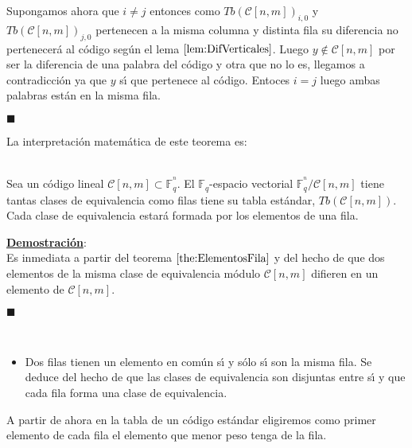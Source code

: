 Supongamos ahora que $i\neq j$ entonces como $Tb(\mathcal{C}[n,m])_{i,0}$ y
$Tb(\mathcal{C}[n,m])_{j,0}$ pertenecen a la misma columna y distinta fila
su diferencia no pertenecer\'a al c\'odigo seg\'un el lema
$\ref{lem:DifVerticales}$. Luego $y\notin \mathcal{C}[n,m]$ por ser la
diferencia de una palabra del c\'odigo y otra que no lo es, llegamos a 
contradicci\'on ya que $y$ s\'{\i} que pertenece al c\'odigo. Entoces $i=j$
luego ambas palabras est\'an en la misma fila.
\begin{flushright}
$\blacksquare$
\end{flushright}
%
\newpage
%
La interpretaci\'on matem\'atica de este teorema es:
\begin{corolario}
\ \\
Sea un c\'odigo lineal $\mathcal{C}[n,m]\subset \mathbb{F}^{^n}_q$. El
 $\mathbb{F}_q$-espacio vectorial $\mathbb{F}^{^n}_q/\mathcal{C}[n,m]$ tiene
tantas clases de equivalencia como filas tiene su tabla est\'andar,
$Tb(\mathcal{C}[n,m])$. Cada clase de equivalencia estar\'a formada por los
elementos de una fila. 
\end{corolario}
\underline{\textbf{Demostraci\'on}}:\\
Es inmediata a partir del teorema $\ref{the:ElementosFila}$ y del hecho de que
dos elementos de la misma clase de equivalencia m\'odulo $\mathcal{C}[n,m]$ 
difieren en un elemento de $\mathcal{C}[n,m]$.
\begin{flushright}
$\blacksquare$
\end{flushright}
\begin{observacion}\ \\
\begin{itemize}
\item Dos filas tienen un elemento en com\'un s\'{\i} y s\'olo s\'{\i} son la
misma fila. Se deduce del hecho de que las clases de equivalencia son disjuntas
entre s\'{\i} y que cada fila forma una clase de equivalencia.
\end{itemize}
\end{observacion}
A partir de ahora en la tabla de un c\'odigo est\'andar eligiremos como primer
elemento de cada fila el elemento que menor peso tenga de la fila.
